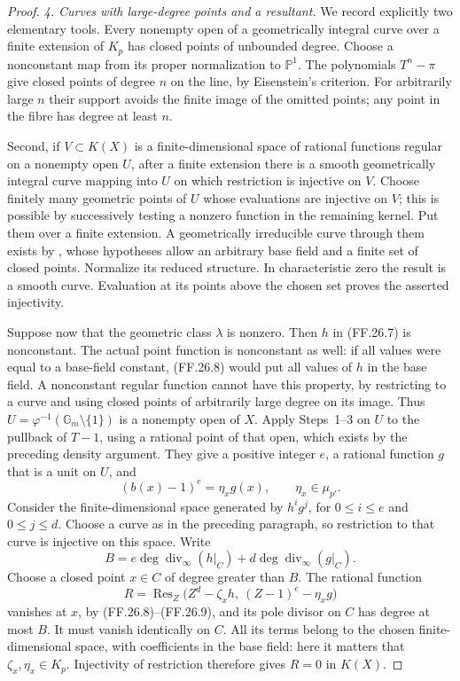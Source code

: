 \begin{proof}
\emph{4. Curves with large-degree points and a resultant.}
We record explicitly two elementary tools. Every nonempty
open of a geometrically integral curve over a finite
extension of \(K_p\) has closed points of unbounded
degree. Choose a nonconstant map from its proper
normalization to \(\mathbb P^1\). The polynomials
\(T^n-\pi\) give closed points of degree \(n\) on
the line, by Eisenstein's criterion. For arbitrarily
large \(n\) their support avoids the finite image
of the omitted points; any point in the fibre has
degree at least \(n\).

Second, if \(V\subset K(X)\) is a finite-dimensional
space of rational functions regular on a nonempty open
\(U\), after a finite extension there is a smooth
geometrically integral curve mapping into \(U\) on
which restriction is injective on \(V\). Choose finitely
many geometric points of \(U\) whose evaluations are
injective on \(V\); this is possible by successively
testing a nonzero function in the remaining kernel.
Put them over a finite extension. A geometrically
irreducible curve through them exists by
\citet[Theorem~1.8, Corollary~1.9]{FF_CharlesPoonen2016},
whose hypotheses allow an arbitrary base field and
a finite set of closed points. Normalize its reduced
structure. In characteristic zero the result is a
smooth curve. Evaluation at its points above the
chosen set proves the asserted injectivity.

Suppose now that the geometric class \(\lambda\)
is nonzero. Then \(h\) in (FF.26.7) is nonconstant.
The actual point function is nonconstant as well:
if all values were equal to a base-field constant,
(FF.26.8) would put all values of \(h\) in the
base field. A nonconstant regular function cannot
have this property, by restricting to a curve and
using closed points of arbitrarily large degree
on its image.
Thus \(U=\varphi^{-1}(\mathbb G_m\setminus\{1\})\)
is a nonempty open of \(X\). Apply Steps~1--3 on
\(U\) to the pullback of \(T-1\), using a
rational point of that open, which exists by the preceding
density argument.
They give a positive integer \(e\), a rational
function \(g\) that is a unit on \(U\), and
\[
                     (b(x)-1)^e=\eta_xg(x),
                           \qquad\eta_x\in\mu_{p'}.
                                                               \tag{FF.26.9}
\]
Consider the finite-dimensional space generated by
\(h^ig^j\), for \(0\leq i\leq e\) and
\(0\leq j\leq d\). Choose a curve as in the preceding
paragraph, so restriction to that curve is injective
on this space. Write
\[
              B=e\deg\operatorname{div}_\infty(h|_C)
                   +d\deg\operatorname{div}_\infty(g|_C).
\]
Choose a closed point \(x\in C\) of degree greater
than \(B\). The rational function
\[
 R=\operatorname{Res}_Z
       \bigl(Z^d-\zeta_xh,\ (Z-1)^e-\eta_xg\bigr)
                                                               \tag{FF.26.10}
\]
vanishes at \(x\), by (FF.26.8)--(FF.26.9), and
its pole divisor on \(C\) has degree at most \(B\).
It must vanish identically on \(C\). All its terms
belong to the chosen finite-dimensional space, with
coefficients in the base field: here it matters that
\(\zeta_x,\eta_x\in K_p\). Injectivity of restriction
therefore gives \(R=0\) in \(K(X)\).


\end{proof}
